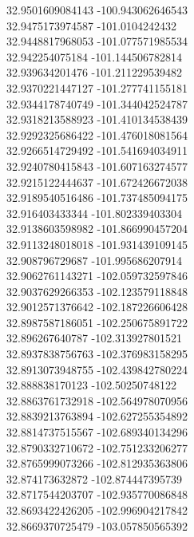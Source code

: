 {32.9501609084143	-100.943062646543\\
32.9475173974587	-101.0104242432\\
32.9448817968053	-101.077571985534\\
32.942254075184	-101.144506782814\\
32.939634201476	-101.211229539482\\
32.9370221447127	-101.277741155181\\
32.9344178740749	-101.344042524787\\
32.9318213588923	-101.410134538439\\
32.9292325686422	-101.476018081564\\
32.9266514729492	-101.541694034911\\
32.9240780415843	-101.607163274577\\
32.9215122444637	-101.672426672038\\
32.9189540516486	-101.737485094175\\
32.916403433344	-101.802339403304\\
32.9138603598982	-101.866990457204\\
32.9113248018018	-101.931439109145\\
32.908796729687	-101.995686207914\\
32.9062761143271	-102.059732597846\\
32.9037629266353	-102.123579118848\\
32.9012571376642	-102.187226606428\\
32.8987587186051	-102.250675891722\\
32.896267640787	-102.313927801521\\
32.8937838756763	-102.376983158295\\
32.8913073948755	-102.439842780224\\
32.888838170123	-102.50250748122\\
32.8863761732918	-102.564978070956\\
32.8839213763894	-102.627255354892\\
32.8814737515567	-102.689340134296\\
32.8790332710672	-102.751233206277\\
32.8765999073266	-102.812935363806\\
32.874173632872	-102.874447395739\\
32.8717544203707	-102.935770086848\\
32.8693422426205	-102.996904217842\\
32.8669370725479	-103.057850565392\\
}
